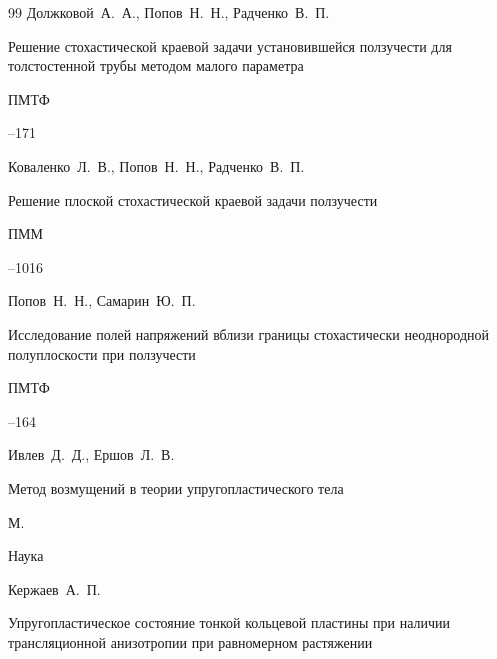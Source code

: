 \begin{thebibliography}{99}
\by Должковой~А.~А., Попов~Н.~Н., Радченко~В.~П.

\paper Решение стохастической краевой задачи установившейся ползучести для толстостенной трубы методом малого параметра

\jour ПМТФ




--171





\by Коваленко~Л.~В., Попов~Н.~Н., Радченко~В.~П.

\paper Решение плоской стохастической краевой задачи ползучести

\jour ПММ




--1016





\by Попов~Н.~Н., Самарин~Ю.~П.

\paper Исследование полей напряжений вблизи границы стохастически неоднородной полуплоскости при ползучести

\jour ПМТФ



--164




\by Ивлев~Д.~Д., Ершов~Л.~В.

\book Метод возмущений в теории упругопластического тела

\publaddr М.

\publ Наука






\by Кержаев~А.~П.

\paper Упругопластическое состояние тонкой кольцевой пластины при наличии трансляционной анизотропии при равномерном растяжении


\end{thebibliography}
